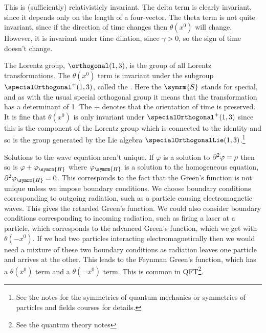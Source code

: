 This is (sufficiently) relativisticly invariant.
The delta term is clearly invariant, since it depends only on the length of a four-vector.
The theta term is not quite invariant, since if the direction of time changes then \(\theta(x^0)\) will change.
However, it is invariant under time dilation, since \(\gamma > 0\), so the sign of time doesn't change.

The Lorentz group, \(\orthogonal(1, 3)\), is the group of all Lorentz transformations.
The \(\theta(x^0)\) term is invariant under the subgroup \(\specialOrthogonal^+(1, 3)\), called the .
Here the \(\symrm{S}\) stands for special, and as with the usual special orthogonal group it means that the transformation has a determinant of 1.
The \(+\) denotes that the orientation of time is preserved.
It is fine that \(\theta(x^0)\) is only invariant under \(\specialOrthogonal^+(1, 3)\) since this is the component of the Lorentz group which is connected to the identity and so is the group generated by the Lie algebra \(\specialOrthogonalLie(1, 3)\).\footnote{See the notes for the symmetries of quantum mechanics or symmetries of particles and fields courses for details.}

Solutions to the wave equation aren't unique.
If \(\varphi\) is a solution to \(\partial^2 \varphi = \rho\) then so is \(\varphi + \varphi_{\symrm{H}}\) where \(\varphi_{\symrm{H}}\) is a solution to the homogeneous equation, \(\dalembertian \varphi_{\symrm{H}} = 0\).
This corresponds to the fact that the Green's function is not unique unless we impose boundary conditions.
We choose boundary conditions corresponding to outgoing radiation, such as a particle causing electromagnetic waves.
This gives the retarded Green's function.
We could also consider boundary conditions corresponding to incoming radiation, such as firing a laser at a particle, which corresponds to the advanced Green's function, which we get with \(\theta(-x^0)\).
If we had two particles interacting electromagnetically then we would need a mixture of these two boundary conditions as radiation leaves one particle and arrives at the other.
This leads to the Feynman Green's function, which has a \(\theta(x^0)\) term and a \(\theta(-x^0)\) term.
This is common in QFT\footnote{See the quantum theory notes}.